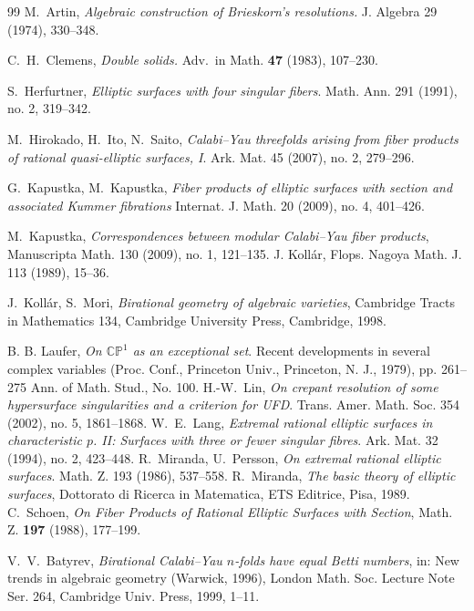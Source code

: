\documentclass[a4paper]{amsart}
\theoremstyle{plain}
\theoremstyle{definition}
\theoremstyle{remark}
\numberwithin{equation}{section}
\begin{document}
\clearpage
\begin{thebibliography}{99}
	 M.~Artin, {\em Algebraic construction of Brieskorn's resolutions.}  J. Algebra  29  (1974), 330--348.

	 C.~H.~Clemens, \emph{Double solids.} Adv.\ in
	Math. \textbf{47} (1983), 107--230.

	S.~Herfurtner,
	\emph{Elliptic surfaces with four singular fibers}.
	Math. Ann. 291 (1991), no. 2, 319--342.

	M.~Hirokado, H.~Ito, N.~Saito,
	\emph{Calabi--Yau threefolds arising from fiber products of rational
	quasi-elliptic surfaces, I}.
	Ark. Mat. 45 (2007), no. 2, 279--296.

	G.~Kapustka, M.~Kapustka,
	\emph{Fiber products of elliptic surfaces with section and associated Kummer fibrations}
	Internat. J. Math. 20 (2009), no. 4, 401--426.

	 M.~Kapustka,
	\emph{Correspondences between modular Calabi--Yau fiber products},
	Manuscripta Math. 130 (2009), no. 1, 121--135.
	J. Koll\'ar,
	Flops.
	Nagoya Math. J. 113 (1989), 15--36.

	 J.~Koll\'ar, S.~Mori,
	\emph{Birational geometry of algebraic varieties},
	Cambridge Tracts in Mathematics 134, Cambridge University Press,
	Cambridge, 1998.

	B. B. Laufer, \emph{On $\mathbb C\mathbb P^{1}$ as an exceptional set}. Recent developments in several complex variables (Proc. Conf., Princeton Univ., Princeton, N. J., 1979), pp. 261--275
	Ann. of Math. Stud., No. 100.
	H.-W.~Lin,
		\emph{On crepant resolution of some hypersurface singularities and a criterion for UFD}.
		Trans. Amer. Math. Soc. 354 (2002), no. 5, 1861--1868.
	 W.~E.~Lang,
	\emph{Extremal rational elliptic surfaces in characteristic \(p\). II:
	Surfaces with three or fewer singular fibres}.
	Ark. Mat. 32 (1994), no. 2, 423--448.
	 R.~Miranda, U.~Persson,
	\emph{On extremal rational elliptic surfaces}.
	Math. Z. 193 (1986), 537--558.
	 R.~Miranda,
	\emph{The basic theory of elliptic surfaces},
	Dottorato di Ricerca in Matematica, ETS Editrice, Pisa, 1989.
	 C.~Schoen, {\em On Fiber Products of
		Rational Elliptic Surfaces with Section}, Math. Z. \textbf{197}
	(1988),
	177--199.

	 V.~V.~Batyrev,
	\emph{Birational Calabi--Yau $n$-folds have equal Betti numbers},
	in: New trends in algebraic geometry (Warwick, 1996),
	London Math. Soc. Lecture Note Ser. 264, Cambridge Univ. Press, 1999, 1--11.


\end{thebibliography}
\end{document}

